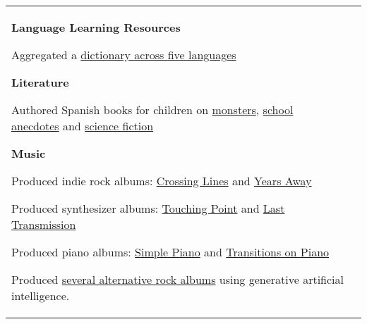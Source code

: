 \documentclass[letterpaper,10pt,oneside]{article}
\newcommand{\itemspacingtwo}{\vspace{0.08cm}}
\newenvironment{body}
{\par\par
\begin{longtable}{p{0.145\textwidth}p{0.81\textwidth}}}
{\par\end{longtable}\par}
\begin{document}
\begin{body}
\textbf{Language Learning Resources}
\begin{comp}
\item Aggregated a \href{https://github.com/lquesada/Lingvaro}{dictionary across five languages}
\end{comp}
\itemspacingtwo

\textbf{Literature}
\begin{comp}
\item Authored Spanish books for children on \href{https://www.amazon.es/dp/B0C47LFXDJ}{monsters}, \href{https://www.amazon.es/dp/B0CGKWWRY3}{school anecdotes} and \href{https://www.amazon.es/dp/B0CTXN78NH}{science fiction}
\end{comp}
\itemspacingtwo

\textbf{Music}
\begin{comp}
\item Produced indie rock albums: \href{https://open.spotify.com/album/1BspGnlv7cWS85sPZ4nfLr}{Crossing Lines} and \href{https://open.spotify.com/album/3JIpCmtM3DP1ehxE80Ufeg}{Years Away}
\item Produced synthesizer albums: \href{https://open.spotify.com/album/3wqaFP9BL2MGaSigExavsM}{Touching Point} and \href{https://open.spotify.com/album/6Im0Un3txvscirw0RBhZ7y}{Last Transmission}
\item Produced piano albums: \href{https://open.spotify.com/album/36yE0PeGFyDJtl4T127Bko}{Simple Piano} and \href{https://open.spotify.com/album/3TsZ2szcmFKWJ67yGMMwUJ}{Transitions on Piano}
\item Produced \href{https://open.spotify.com/artist/6GdiI8ZKeWhSY73WWOhbep}{several alternative rock albums} using generative artificial intelligence.

\end{comp}

\end{body}
\end{document}

